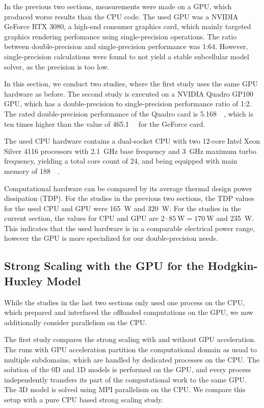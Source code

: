 In the previous two sections, measurements were made on a GPU, which produced worse results than the CPU code. The used GPU was a NVIDIA GeForce RTX 3080, a high-end consumer graphics card, which mainly targeted graphics rendering perfomance using single-precision operations. The ratio between double-precision and single-precision performance was 1:64. However, single-precision calculations were found to not yield a stable subcellular model solver, as the precision is too low. 

In this section, we conduct two studies, where the first study uses the same GPU hardware as before. The second study is executed on a NVIDIA Quadro GP100 GPU, which has a double-precision to single-precision performance ratio of 1:2.
The rated double-precision performance of the Quadro card is \SI{5.168}{\tera\flops}, which is ten times higher than the value of \SI{465.1}{\giga\flops} for the GeForce card. 

The used CPU hardware contains a dual-socket CPU with two 12-core Intel Xeon Silver 4116 processors with \SI{2.1}{\giga\hertz} base frequency and \SI{3}{\giga\hertz} maximum turbo frequency, yielding a total core count of 24, and being equipped with main memory of \SI{188}{\gibi\byte}. 

Computational hardware can be compared by its average thermal design power dissipation (TDP). For the studies in the previous two sections, the TDP values for the used CPU and GPU were \SI{165}{\watt} and \SI{320}{\watt}. For the studies in the current section, the values for CPU and GPU are $2\cdot \SI{85}{\watt} = \SI{170}{\watt}$ and \SI{235}{\watt}. This indicates that the used hardware is in a comparable electrical power range, however the GPU is more specialized for our double-precision needs.

\subsection{Strong Scaling with the GPU for the Hodgkin-Huxley Model}\label{sec:strong_scaling_gpu_hodgkin_huxley}

While the studies in the last two sections only used one process on the CPU, which prepared and interfaced the offloaded computations on the GPU,
we now additionally consider parallelism on the CPU.

The first study compares the strong scaling with and without GPU acceleration. The runs with GPU acceleration partition the computational domain as usual to multiple subdomains, which are handled by dedicated processes on the CPU. The solution of the 0D and 1D models is performed on the GPU, and every process independently transfers its part of the computational work to the same GPU. The 3D model is solved using MPI parallelism on the CPU. We compare this setup with a pure CPU based strong scaling study.

